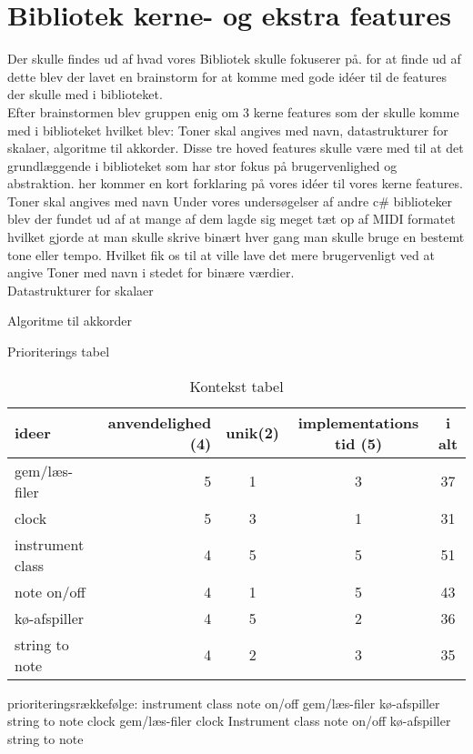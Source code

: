 \section{Bibliotek kerne- og ekstra features}
Der skulle findes ud af hvad vores Bibliotek skulle fokuserer på. for at finde ud af dette blev der lavet en brainstorm for at komme med gode idéer til de features der skulle med i biblioteket. \\

Efter brainstormen blev gruppen enig om 3 kerne features som der skulle komme med i biblioteket hvilket blev: Toner skal angives med navn, datastrukturer for skalaer, algoritme til akkorder. Disse tre hoved features skulle være med til at det grundlæggende i biblioteket som har stor fokus på brugervenlighed og abstraktion. her kommer en kort forklaring på vores idéer til vores kerne features. \\


Toner skal angives med navn
Under vores undersøgelser af andre c# biblioteker blev der fundet ud af at mange af dem lagde sig meget tæt op af MIDI formatet hvilket gjorde at man skulle skrive binært hver gang man skulle bruge en bestemt tone eller tempo. Hvilket fik os til at ville lave det mere brugervenligt ved at angive Toner med navn i stedet for binære værdier.\\  

Datastrukturer for skalaer


Algoritme til akkorder




Prioriterings tabel
\begin{table}[H]
 \centering
 \caption{Kontekst tabel}
 \label{kontekst-tabel}
 \begin{tabular}{l|r|c|c|c}
     ideer               & anvendelighed (4)     & unik(2)        & implementations tid (5)       &i alt  \\ \hline
gem/læs-filer       & 5		         & 1 	      & 3    		 & 37 \\          
clock	            & 5              & 3 	      & 1 			 & 31 \\
instrument class    & 4		         & 5          & 5 	         & 51 \\
note on/off         & 4		         & 1	      & 5		     & 43 \\
kø-afspiller        & 4	             & 5	      & 2			 & 36 \\
string to note      & 4		         & 2	      & 3			 & 35

\end{tabular}
\end{table}

prioriteringsrækkefølge:
instrument class
note on/off
gem/læs-filer 
kø-afspiller 
string to note
clock	
gem/læs-filer
clock	
Instrument class
note on/off          
kø-afspiller          
string to note   

